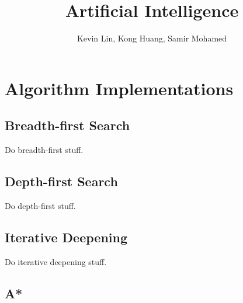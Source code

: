 \documentclass[a4paper,oneside,10pt]{report}
\begin{document}
\pagestyle{empty} %



\title{Artificial Intelligence}
\author{Kevin Lin, Kong Huang, Samir Mohamed}
\maketitle



\tableofcontents %
\cleardoublepage %

\pagestyle{plain} %


\setcounter{page}{1}

\chapter{Algorithm Implementations}\label{implementations}

\section{Breadth-first Search}\label{breadth}

Do breadth-first stuff.

\section{Depth-first Search}\label{depth}

Do depth-first stuff.

\section{Iterative Deepening}\label{iterative}

Do iterative deepening stuff.

\section{A*}\label{astar}
\end{document}
